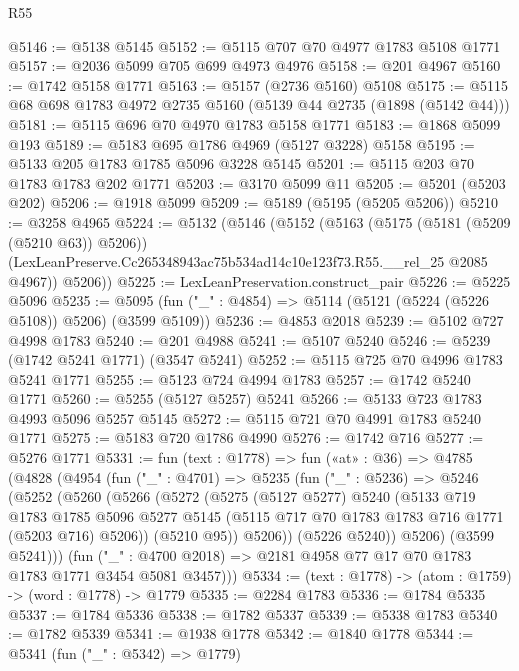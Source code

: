 \begin{lexlean}{R55}
\begin{coremodule}
@5146 := @5138 @5145
@5152 := @5115 @707 @70 @4977 @1783 @5108 @1771
@5157 := @2036 @5099 @705 @699 @4973 @4976
@5158 := @201 @4967
@5160 := @1742 @5158 @1771
@5163 := @5157 (@2736 @5160) @5108
@5175 := @5115 @68 @698 @1783 @4972 @2735 @5160 (@5139 @44 @2735 (@1898 (@5142 @44)))
@5181 := @5115 @696 @70 @4970 @1783 @5158 @1771
@5183 := @1868 @5099 @193
@5189 := @5183 @695 @1786 @4969 (@5127 @3228) @5158
@5195 := @5133 @205 @1783 @1785 @5096 @3228 @5145
@5201 := @5115 @203 @70 @1783 @1783 @202 @1771
@5203 := @3170 @5099 @11
@5205 := @5201 (@5203 @202)
@5206 := @1918 @5099
@5209 := @5189 (@5195 (@5205 @5206))
@5210 := @3258 @4965
@5224 := @5132
    (@5146
      (@5152
        (@5163
          (@5175 (@5181 (@5209 (@5210 @63)) @5206))
          (LexLeanPreserve.Cc265348943ac75b534ad14c10e123f73.R55.__rel_25 @2085 @4967))
        @5206))
@5225 := LexLeanPreservation.construct_pair
@5226 := @5225 @5096
@5235 := @5095 (fun ("_" : @4854) => @5114 (@5121 (@5224 (@5226 @5108)) @5206) (@3599 @5109))
@5236 := @4853 @2018
@5239 := @5102 @727 @4998 @1783
@5240 := @201 @4988
@5241 := @5107 @5240
@5246 := @5239 (@1742 @5241 @1771) (@3547 @5241)
@5252 := @5115 @725 @70 @4996 @1783 @5241 @1771
@5255 := @5123 @724 @4994 @1783
@5257 := @1742 @5240 @1771
@5260 := @5255 (@5127 @5257) @5241
@5266 := @5133 @723 @1783 @4993 @5096 @5257 @5145
@5272 := @5115 @721 @70 @4991 @1783 @5240 @1771
@5275 := @5183 @720 @1786 @4990
@5276 := @1742 @716
@5277 := @5276 @1771
@5331 := fun (text : @1778) =>
  fun («at» : @36) =>
  @4785
    (@4828
      (@4954
        (fun ("_" : @4701) =>
        @5235
          (fun ("_" : @5236) =>
          @5246
            (@5252
              (@5260
                (@5266
                  (@5272
                    (@5275
                      (@5127 @5277)
                      @5240
                      (@5133
                        @719
                        @1783
                        @1785
                        @5096
                        @5277
                        @5145
                        (@5115 @717 @70 @1783 @1783 @716 @1771 (@5203 @716) @5206))
                      (@5210 @95))
                    @5206))
                (@5226 @5240))
              @5206)
            (@3599 @5241)))
        (fun ("_" : @4700 @2018) => @2181 @4958 @77 @17 @70 @1783 @1783 @1771 @3454 @5081 @3457)))
@5334 := (text : @1778) -> (atom : @1759) -> (word : @1778) -> @1779
@5335 := @2284 @1783
@5336 := @1784 @5335
@5337 := @1784 @5336
@5338 := @1782 @5337
@5339 := @5338 @1783
@5340 := @1782 @5339
@5341 := @1938 @1778
@5342 := @1840 @1778
@5344 := @5341 (fun ("_" : @5342) => @1779)

\end{coremodule}
\end{lexlean}
